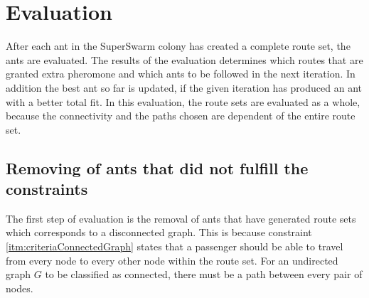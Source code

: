 \section{Evaluation}
\label{sec:algoEvaluation}
After each ant in the SuperSwarm colony has created a complete route set, the ants are evaluated. The results of the evaluation determines which routes that are granted extra pheromone and which ants to be followed in the next iteration. In addition the best ant so far is updated, if the given iteration has produced an ant with a better total fit. In this evaluation, the route sets are evaluated as a whole, because the connectivity and the paths chosen are dependent of the entire route set. 

\subsection{Removing of ants that did not fulfill the constraints}
The first step of evaluation is the removal of ants that have generated route sets which corresponds to a disconnected graph. This is because constraint \vref{itm:criteriaConnectedGraph} states that a passenger should be able to travel from every node to every other node within the route set. For an undirected graph $G$ to be classified as connected, there must be a path between every pair of nodes. 

